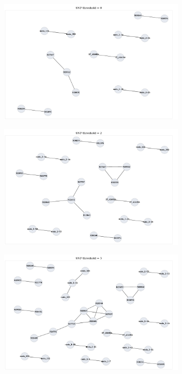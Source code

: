 \begin{figure}
     \centering
     \begin{subfigure}[b]{0.45\textwidth}
         \centering
         \includegraphics[width=\textwidth]{Appendix1/Figs/bcftools_clusters_t0.png}
         \caption{}
     \end{subfigure}
     \hfill
     \begin{subfigure}[b]{0.45\textwidth}
         \centering
         \includegraphics[width=\textwidth]{Appendix1/Figs/bcftools_clusters_t2.png}
         \caption{}
     \end{subfigure}
     \begin{subfigure}[b]{0.45\textwidth}
         \centering
         \includegraphics[width=\textwidth]{Appendix1/Figs/bcftools_clusters_t5.png}

\end{subfigure}
\end{figure}
